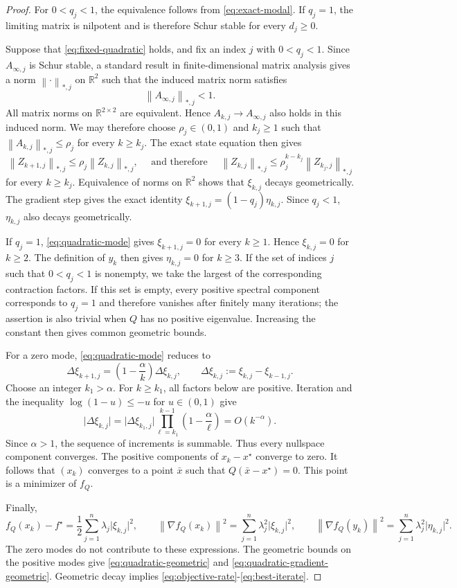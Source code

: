 \documentclass[10pt,a4paper]{amsart}
\newcommand{\R}{\mathbb{R}}
\newcommand{\norm}[1]{\left\lVert #1\right\rVert}
\begin{document}
\begin{proof}
For $0<q_j<1$, the equivalence follows from
\eqref{eq:exact-modal}. If $q_j=1$, the limiting matrix is nilpotent and is
therefore Schur stable for every $d_j\geq0$.

Suppose that \eqref{eq:fixed-quadratic} holds, and
fix an index $j$ with $0<q_j<1$. Since $A_{\infty,j}$ is Schur
stable, a standard result in
finite-dimensional matrix analysis gives a norm $\norm{\cdot}_{\ast,j}$ on
$\R^2$ such that the induced matrix norm satisfies
$$
\norm{A_{\infty,j}}_{\ast,j}<1.
$$
All matrix norms on $\R^{2\times2}$ are equivalent. Hence
$A_{k,j}\to A_{\infty,j}$ also holds in this induced norm. We may therefore
choose $\rho_j\in(0,1)$ and $k_j\geq1$ such that $
\norm{A_{k,j}}_{\ast,j}\leq\rho_j$
for every $k\geq k_j$. The exact state equation then gives
$$
\norm{Z_{k+1,j}}_{\ast,j}
\leq\rho_j\norm{Z_{k,j}}_{\ast,j},
\quad \mbox{ and therefore }
\quad
\norm{Z_{k,j}}_{\ast,j}
\leq \rho_j^{k-k_j}\norm{Z_{k_j,j}}_{\ast,j}
$$
for every $k\geq k_j$. Equivalence of norms on $\R^2$ shows that
$\xi_{k,j}$ decays geometrically. The gradient step gives the exact identity $
\xi_{k+1,j}=(1-q_j)\eta_{k,j}.$
Since $q_j<1$, $\eta_{k,j}$ also decays geometrically.

If $q_j=1$, \eqref{eq:quadratic-mode} gives $\xi_{k+1,j}=0$ for every $k\geq1$. Hence $\xi_{k,j}=0$ for $k\geq2$. The definition of $y_k$ then
gives $\eta_{k,j}=0$ for $k\geq3$. If the set of indices $j$ such that $0<q_j<1$ is nonempty, we take the largest of the corresponding contraction factors. If this set is empty,
every positive spectral component corresponds to $q_j=1$ and therefore vanishes after finitely many iterations; the assertion is also trivial
when $Q$ has no positive eigenvalue. Increasing the constant then gives common geometric bounds.

For a zero mode, \eqref{eq:quadratic-mode} reduces to
$$
\Delta\xi_{k+1,j}
=\left(1-\frac{\alpha}{k}\right)\Delta\xi_{k,j},
\qquad
\Delta\xi_{k,j}:=\xi_{k,j}-\xi_{k-1,j}.
$$
Choose an integer $k_1>\alpha$. For $k\geq k_1$, all factors below are
positive. Iteration and the inequality $\log(1-u)\leq-u$ for $u\in(0,1)$
give
$$
\lvert\Delta\xi_{k,j}\rvert
=\lvert\Delta\xi_{k_1,j}\rvert
\prod_{\ell=k_1}^{k-1}\left(1-\frac{\alpha}{\ell}\right)
=O(k^{-\alpha}).
$$
Since $\alpha>1$, the sequence of increments is summable. Thus every nullspace component converges. The positive components of $x_k-x^\star$
converge to zero. It follows that $(x_k)$ converges to a point $\bar x$ such that $Q(\bar x-x^\star)=0$. This point is a minimizer of $f_Q$.

Finally,
$$
f_Q(x_k)-f^\star
=\frac12\sum_{j=1}^n\lambda_j\lvert\xi_{k,j}\rvert^2, \qquad
\norm{\nabla f_Q(x_k)}^2
=\sum_{j=1}^n\lambda_j^2\lvert\xi_{k,j}\rvert^2,
\qquad
\norm{\nabla f_Q(y_k)}^2
=\sum_{j=1}^n\lambda_j^2\lvert\eta_{k,j}\rvert^2.
$$
The zero modes do not contribute to these expressions. The geometric bounds
on the positive modes give \eqref{eq:quadratic-geometric} and
\eqref{eq:quadratic-gradient-geometric}. Geometric decay implies
\eqref{eq:objective-rate}-\eqref{eq:best-iterate}.
\end{proof}
\end{document}
